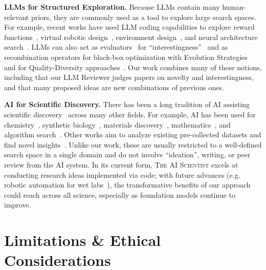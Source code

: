 \documentclass[11pt, a4paper]{include/gdm_format}
\newcommand{\ouralgo}{\textsc{The AI Scientist}\xspace}
\begin{document}
\textbf{LLMs for Structured Exploration.}
Because LLMs contain many human-relevant priors, they are commonly used as a tool to explore large search spaces.
For example, recent works have used LLM coding capabilities to explore reward functions~\citep{ma2023eureka, yu2023language}, virtual robotic design~\citep{lehman2023evolution}, environment design~\citep{omniepic}, and neural architecture search~\citep{chen2024evoprompting}.
LLMs can also act as evaluators~\citep{zheng2024judging} for ``interestingness''~\citep{zhang2024omni, ige} and as recombination operators for black-box optimization with Evolution Strategies~\citep{lange2024large, song2024position} and for Quality-Diversity approaches~\citep{lim2024large, bradley2024quality,ding2024quality}.
Our work combines many of these notions, including that our LLM Reviewer judges papers on novelty and interestingness, and that many proposed ideas are new combinations of previous ones.

\textbf{AI for Scientific Discovery.}
There has been a long tradition of AI assisting scientific discovery~\citep{langley2024integrated, langley1987scientific} across many other fields.
For example, AI has been used for chemistry~\citep{buchanan1981dendral}, synthetic biology~\citep{jumper2021alphafold, hayes2024simulating}, materials discovery~\citep{pyzer2022alphamaterials,merchant2023scaling,szymanski2023autonomous}, mathematics~\citep{romera2024mathematical, lenat1977automated, lenat1984and}, and algorithm search~\citep{fawzi2022alphatensor}.
Other works aim to analyze existing pre-collected datasets and find novel insights~\citep{langley1987scientific,ifargan2024autonomousllmdrivenresearchdata,majumder2024discoverybenchdatadrivendiscoverylarge, yang2024largelanguagemodelsautomated, falkenhainer1986integrating, zytkow1996automated, nordhausen1990robust}.
Unlike our work, these are usually restricted to a well-defined search space in a single domain and do not involve ``ideation'', writing, or peer review from the AI system.
In its current form, \ouralgo excels at conducting research ideas implemented via code; with future advances (e.g. robotic automation for wet labs~\citep{kehoe2015survey, arnold2022cloud, zucchelli2021highly,sparkes2010towards}), the transformative benefits of our approach could reach across all science, especially as foundation models continue to improve.

\section{Limitations \& Ethical Considerations}
\label{sec:limitations}
\end{document}
